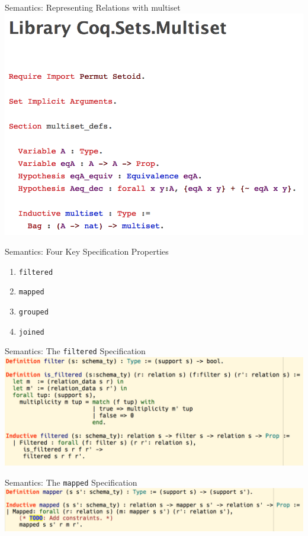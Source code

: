\begin{frame}{Semantics: Representing Relations with multiset}
\centering
  \includegraphics[scale=0.5]{CoqIDE/Semantics/Multisets.png}
\end{frame}

\begin{frame}{Semantics: Four Key Specification Properties}
\centering
  \begin{enumerate}
  \item \texttt{filtered}
	\item \texttt{mapped}
	\item \texttt{grouped}
	\item \texttt{joined}
  \end{enumerate}
\end{frame}

\begin{frame}{Semantics: The \texttt{filtered} Specification}
\centering
  \includegraphics[scale=0.55]{CoqIDE/Semantics/filtered.png}
\end{frame}

\begin{frame}{Semantics: The \texttt{mapped} Specification}
\centering
  \includegraphics[scale=0.55]{CoqIDE/Semantics/mapped.png}
\end{frame}

